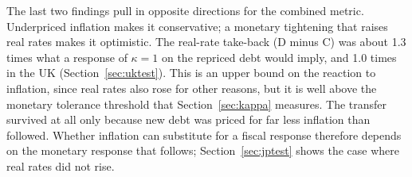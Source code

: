 The last two findings pull in opposite directions for the combined metric. Underpriced inflation makes it conservative; a monetary tightening that raises real rates makes it optimistic. The real-rate take-back (D minus C) was about 1.3 times what a response of $\kappa=1$ on the repriced debt would imply, and 1.0 times in the UK (Section~\ref{sec:uktest}). This is an upper bound on the reaction to inflation, since real rates also rose for other reasons, but it is well above the monetary tolerance threshold that Section~\ref{sec:kappa} measures. The transfer survived at all only because new debt was priced for far less inflation than followed. Whether inflation can substitute for a fiscal response therefore depends on the monetary response that follows; Section~\ref{sec:jptest} shows the case where real rates did not rise.

